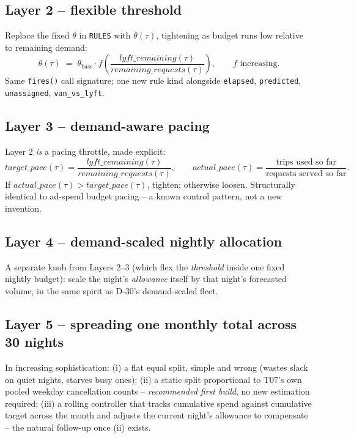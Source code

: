 \documentclass[11pt]{article}
\begin{document}
\subsection{Layer 2 -- flexible threshold}
Replace the fixed $\theta$ in \texttt{RULES} with $\theta(\tau)$, tightening as budget runs low relative to
remaining demand:
\[
  \theta(\tau) \;=\; \theta_{\text{base}} \cdot f\!\left(\frac{\textit{lyft\_remaining}(\tau)}
  {\textit{remaining\_requests}(\tau)}\right), \qquad f \text{ increasing.}
\]
Same \texttt{fires()} call signature; one new rule kind alongside \texttt{elapsed}, \texttt{predicted},
\texttt{unassigned}, \texttt{van\_vs\_lyft}.

\subsection{Layer 3 -- demand-aware pacing}
Layer 2 \emph{is} a pacing throttle, made explicit:
\[
  \textit{target\_pace}(\tau) = \frac{\textit{lyft\_remaining}(\tau)}{\textit{remaining\_requests}(\tau)},
  \qquad
  \textit{actual\_pace}(\tau) = \frac{\text{trips used so far}}{\text{requests served so far}}.
\]
If $\textit{actual\_pace}(\tau) > \textit{target\_pace}(\tau)$, tighten; otherwise loosen. Structurally
identical to ad-spend budget pacing -- a known control pattern, not a new invention.

\subsection{Layer 4 -- demand-scaled nightly allocation}
A separate knob from Layers 2--3 (which flex the \emph{threshold} inside one fixed nightly budget): scale the
night's \emph{allowance} itself by that night's forecasted volume, in the same spirit as D-30's demand-scaled
fleet.

\subsection{Layer 5 -- spreading one monthly total across 30 nights}
In increasing sophistication: (i) a flat equal split, simple and wrong (wastes slack on quiet nights,
starves busy ones); (ii) a static split proportional to T07's own pooled weekday cancellation counts --
\emph{recommended first build}, no new estimation required; (iii) a rolling controller that tracks cumulative
spend against cumulative target across the month and adjusts the current night's allowance to compensate --
the natural follow-up once (ii) exists.
\end{document}
